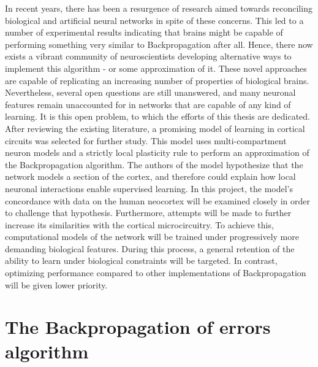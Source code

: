 In recent years, there has been a resurgence of research aimed towards reconciling biological and artificial neural
networks in spite of these concerns. This led to a number of experimental results indicating that brains might be
capable of performing something very similar to Backpropagation after all. Hence, there now exists a vibrant community
of neuroscientists developing alternative ways to implement this algorithm - or some approximation of it. These novel
approaches are capable of replicating an increasing number of properties of biological brains. Nevertheless, several
open questions are still unanswered, and many neuronal features remain unaccounted for in networks that are capable of
any kind of learning. It is this open problem, to which the efforts of this thesis are dedicated. After reviewing the
existing literature, a promising model of learning in cortical circuits was selected for further study. This model uses
multi-compartment neuron models and a strictly local plasticity rule to perform an approximation of the Backpropagation
algorithm. The authors of the model hypothesize that the network models a section of the cortex, and therefore could
explain how local neuronal interactions enable supervised learning. In this project, the model's concordance with data
on the human neocortex will be examined closely in order to challenge that hypothesis. Furthermore, attempts will be made
to further increase its similarities with the cortical microcircuitry. To achieve this, computational models of the
network will be trained under progressively more demanding biological features. During this process, a general retention
of the ability to learn under biological constraints will be targeted. In contrast, optimizing performance compared to
other implementations of Backpropagation will be given lower priority.


\section{The Backpropagation of errors algorithm}

